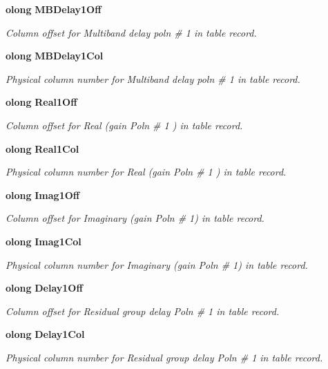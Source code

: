 \begin{CompactItemize}
{\bf olong} {\bf MBDelay1Off}
\begin{CompactList}\small\item\em Column offset for Multiband delay poln \# 1 in table record. \item\end{CompactList}\item 
{\bf olong} {\bf MBDelay1Col}
\begin{CompactList}\small\item\em Physical column number for Multiband delay poln \# 1 in table record. \item\end{CompactList}\item 
{\bf olong} {\bf Real1Off}
\begin{CompactList}\small\item\em Column offset for Real (gain Poln \# 1 ) in table record. \item\end{CompactList}\item 
{\bf olong} {\bf Real1Col}
\begin{CompactList}\small\item\em Physical column number for Real (gain Poln \# 1 ) in table record. \item\end{CompactList}\item 
{\bf olong} {\bf Imag1Off}
\begin{CompactList}\small\item\em Column offset for Imaginary (gain Poln \# 1) in table record. \item\end{CompactList}\item 
{\bf olong} {\bf Imag1Col}
\begin{CompactList}\small\item\em Physical column number for Imaginary (gain Poln \# 1) in table record. \item\end{CompactList}\item 
{\bf olong} {\bf Delay1Off}
\begin{CompactList}\small\item\em Column offset for Residual group delay Poln \# 1 in table record. \item\end{CompactList}\item 
{\bf olong} {\bf Delay1Col}
\begin{CompactList}\small\item\em Physical column number for Residual group delay Poln \# 1 in table record. \item\end{CompactList}\item 

\end{CompactItemize}
